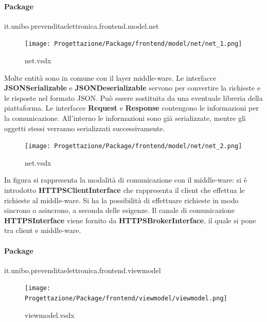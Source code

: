 \documentclass[a4paper]{article}
\begin{document}
\newpage

\paragraph{Package} it.unibo.prevenditaelettronica.frontend.model.net



\begin{figure}[H]
    \texttt{[image: Progettazione/Package/frontend/model/net/net\_1.png]}
    \centering
    \caption{net.vsdx}
\end{figure}

Molte entità sono in comune con il layer middle-ware. Le interfacce \textbf{JSONSerializable} e \textbf{JSONDeserializable} servono per convertire la richieste e le risposte nel formato JSON. Può essere sostituita da una eventuale libreria della piattaforma. Le interfacce \textbf{Request} e \textbf{Response} contengono le informazioni per la comunicazione. All'interno le informazioni sono già serializzate, mentre gli oggetti stessi verranno serializzati successivamente.


\begin{figure}[H]
    \texttt{[image: Progettazione/Package/frontend/model/net/net\_2.png]}
    \centering
    \caption{net.vsdx}
\end{figure}

In figura si rappresenta la modalità di comunicazione con il middle-ware: si è introdotto \textbf{HTTPSClientInterface} che rappresenta il client che effettua le richieste al middle-ware. Si ha la possibilità di effettuare richieste in modo sincrono o asincrono, a seconda delle esigenze. Il canale di comunicazione \textbf{HTTPSInterface} viene fornito da \textbf{HTTPSBrokerInterface}, il quale si pone tra client e middle-ware.

\newpage


\newpage

\paragraph{Package} it.unibo.prevenditaelettronica.frontend.viewmodel

\begin{figure}[H]
    \texttt{[image: Progettazione/Package/frontend/viewmodel/viewmodel.png]}
    \centering
    \caption{viewmodel.vsdx}
\end{figure}
\end{document}
